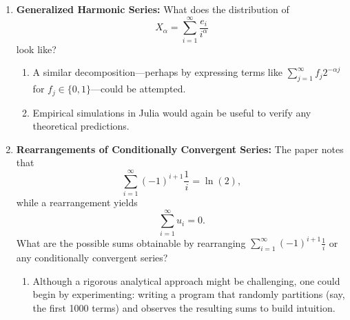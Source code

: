 \documentclass{article}
\begin{document}
\begin{enumerate}
    \item \textbf{Generalized Harmonic Series:} What does the distribution of 
    \[
    X_\alpha = \sum_{i=1}^{\infty} \frac{e_i}{i^\alpha}
    \]
    look like?
    \begin{enumerate}
        \item A similar decomposition—perhaps by expressing terms like \(\sum_{j=1}^{\infty} f_j 2^{-\alpha j}\) for \(f_j \in \{0,1\}\)—could be attempted.
        \item Empirical simulations in Julia would again be useful to verify any theoretical predictions.
    \end{enumerate}
    
    \item \textbf{Rearrangements of Conditionally Convergent Series:} The paper notes that 
    \[
    \sum_{i=1}^{\infty} (-1)^{i+1}\frac{1}{i} = \ln(2),
    \]
    while a rearrangement yields 
    \[
    \sum_{i=1}^{\infty} u_i = 0.
    \]
    What are the possible sums obtainable by rearranging \(\sum_{i=1}^{\infty} (-1)^{i+1}\frac{1}{i}\) or any conditionally convergent series?
    \begin{enumerate}
        \item Although a rigorous analytical approach might be challenging, one could begin by experimenting: writing a program that randomly partitions (say, the first 1000 terms) and observes the resulting sums to build intuition.
    \end{enumerate}
    
\end{enumerate}
    
\end{document}
